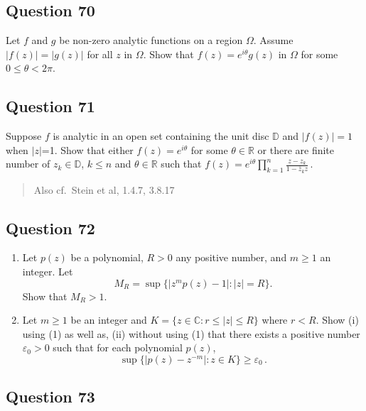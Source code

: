 \documentclass[12pt]{article}
\begin{document}
\hypertarget{question-70-2}{%
\subsection{Question 70}\label{question-70-2}}

Let \(f\) and \(g\) be non-zero analytic functions on a region
\(\Omega\). Assume \(|f(z)| = |g(z)|\) for all \(z\) in \(\Omega\). Show
that \(f(z) = e^{i \theta} g(z)\) in \(\Omega\) for some
\(0 \leq \theta < 2 \pi\).

\hypertarget{question-71-2}{%
\subsection{Question 71}\label{question-71-2}}

Suppose \(f\) is analytic in an open set containing the unit disc
\(\mathbb D\) and \(|f(z)| =1\) when \(|z|\)=1. Show that either
\(f(z) = e^{i \theta}\) for some \(\theta \in \mathbb R\) or there are
finite number of \(z_k \in \mathbb D\), \(k \leq n\) and
\(\theta \in \mathbb R\) such that
\(\displaystyle f(z) = e^{i\theta} \prod_{k=1}^n \frac{z-z_k}{1 - \bar{z}_k z } \, .\)

\begin{quote}
Also cf.~Stein et al, 1.4.7, 3.8.17
\end{quote}

\hypertarget{question-72-2}{%
\subsection{Question 72}\label{question-72-2}}

\begin{enumerate}
\def\labelenumi{(\arabic{enumi})}
\item
  Let \(p(z)\) be a polynomial, \(R>0\) any positive number, and
  \(m \geq 1\) an integer. Let
  \[M_R = \sup \{ |z^{m} p(z) - 1|: |z| = R  \}.\] Show that \(M_R>1\).
\item
  Let \(m \geq 1\) be an integer and
  \(K = \{z \in {\mathbb C}: r \leq |z| \leq R \}\) where \(r<R\). Show
  (i) using (1) as well as, (ii) without using (1) that there exists a
  positive number \(\varepsilon_0>0\) such that for each polynomial
  \(p(z)\),
  \[\sup \{|p(z) - z^{-m}|: z \in K  \} \geq \varepsilon_0 \, .\]
\end{enumerate}

\hypertarget{question-73-2}{%
\subsection{Question 73}\label{question-73-2}}
\end{document}
